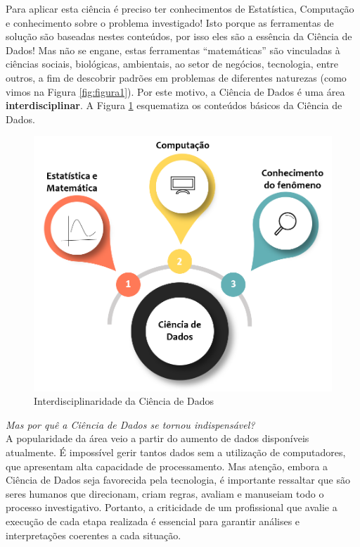 \documentclass[
  portuguese,
  oneside]{book}
\begin{document}
Para aplicar esta ciência é preciso ter conhecimentos de Estatística, Computação e conhecimento sobre o problema investigado! Isto porque as ferramentas de solução são baseadas nestes conteúdos, por isso eles são a essência da Ciência de Dados! Mas não se engane, estas ferramentas ``matemáticas'' são vinculadas à ciências sociais, biológicas, ambientais, ao setor de negócios, tecnologia, entre outros, a fim de descobrir padrões em problemas de diferentes naturezas (como vimos na Figura \ref{fig:figura1}). Por este motivo, a Ciência de Dados é uma área \textbf{interdisciplinar}. A Figura \ref{fig:figura2} esquematiza os conteúdos básicos da Ciência de Dados.

\begin{figure}

{\centering \includegraphics[width=0.6\linewidth]{fig_cap1/tripecd} 

}

\caption{Interdisciplinaridade da Ciência de Dados}\label{fig:figura2}
\end{figure}

\emph{Mas por quê a Ciência de Dados se tornou indispensável?}\\
A popularidade da área veio a partir do aumento de dados disponíveis atualmente. É impossível gerir tantos dados sem a utilização de computadores, que apresentam alta capacidade de processamento. Mas atenção, embora a Ciência de Dados seja favorecida pela tecnologia, é importante ressaltar que são seres humanos que direcionam, criam regras, avaliam e manuseiam todo o processo investigativo. Portanto, a criticidade de um profissional que avalie a execução de cada etapa realizada é essencial para garantir análises e interpretações coerentes a cada situação.
\end{document}
